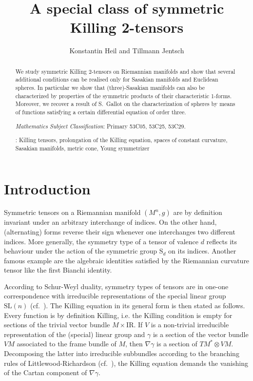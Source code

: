 \documentclass[11pt,a4paper]{article}
\title{A special class of symmetric Killing 2-tensors}
\author{Konstantin Heil and Tillmann Jentsch}
\theoremstyle{plain}
\theoremstyle{remark}
\newcommand{\R}{\mathrm{I\!R}}
\newcommand{\SL}{\mathrm{SL}}
\newcommand{\rmS}{\mathrm{S}}
\begin{document}
\sloppy

\maketitle
\begin{abstract}
We study symmetric Killing 2-tensors on Riemannian manifolds and show that several additional conditions can be realised only for Sasakian manifolds and Euclidean spheres. 
In particular we show that (three)-Sasakian manifolds can also be characterized by properties of the symmetric products of their characteristic 1-forms. 
Moreover, we recover a result of S.~Gallot on the characterization of spheres by means of functions satisfying a certain differential equation of order three.
\\

\noindent

 {\it Mathematics Subject Classification}: Primary 53C05, 53C25, 53C29.

{}: 
Killing tensors, prolongation of the Killing equation, spaces of constant curvature, Sasakian manifolds, metric cone, Young symmetrizer
\end{abstract}

\section{Introduction}
Symmetric tensors on a Riemannian manifold $(M^n,g)$ are by definition invariant under an arbitrary interchange of indices. On the other hand, (alternating) forms reverse their sign  whenever one interchanges two different indices. More generally,  the symmetry type of a tensor of valence $d$ reflects its behaviour under the action of the symmetric group $\rmS_d$ on its indices. Another famous example are the algebraic identities satisfied by the Riemannian curvature tensor like the first Bianchi identity. 

According to Schur-Weyl duality, symmetry types of tensors are in one-one correspondence with irreducible representations of the special linear group $\SL(n)$ (cf.~\cite[Theorem 6.3]{FH}). The Killing equation  in its general form is then stated as follows. Every function is by definition Killing, i.e. the Killing condition is empty for sections of the trivial vector bundle $M\times\R$. If $V$ is a non-trivial irreducible representation of the (special) linear group and  $\gamma$ is a section of the vector bundle $VM$ associated to the frame bundle of $M$, then $\nabla \gamma$ is a section of $TM^* \otimes VM$. Decomposing the latter into irreducible subbundles  according to the branching rules of Littlewood-Richardson (cf.~\cite[App.~A]{FH}), the Killing equation demands the vanishing of the Cartan component of $\nabla \gamma$.
\end{document}
